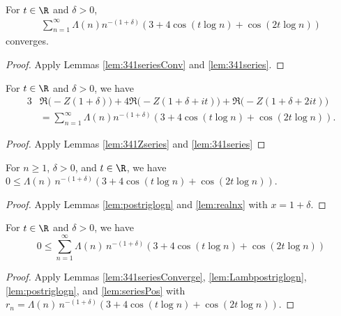 \begin{lemma}\label{lem:341seriesConverge}  \leanok
For $t\in\R$ and $\delta>0$,
\begin{align*}
\sum_{n=1}^{\infty} \Lambda(n) n^{-(1+\delta)}(3 + 4\cos(t\log n) + \cos(2t\log n))
\end{align*}
converges.
\end{lemma}
\begin{proof} \leanok {}
Apply Lemmas \ref{lem:341seriesConv} and \ref{lem:341series}.
\end{proof}

\begin{lemma}\label{lem:341series2}  \leanok
For $t\in\R$ and $\delta>0$, we have
\begin{align*}
3&\Re\big(-Z(1+\delta)\big) + 4\Re\big(-Z(1+\delta+it)\big) + \Re\big(-Z(1+\delta+2it)\big)\\
& =  \sum_{n=1}^{\infty} \Lambda(n) n^{-(1+\delta)}(3 + 4\cos(t\log n) + \cos(2t\log n)).
\end{align*}
\end{lemma}
\begin{proof} \leanok {}
Apply Lemmas \ref{lem:341Zseries} and \ref{lem:341series}
\end{proof}


\begin{lemma}\label{lem:Lambpostriglogn}  \leanok
For $n\ge1$, $\delta>0$, and $t\in\R$, we have $0\le \Lambda(n)\, n^{-(1+\delta)}(3 + 4\cos(t\log n) + \cos(2t\log n))$.
\end{lemma}
\begin{proof} \leanok {}
Apply Lemmas \ref{lem:postriglogn} and \ref{lem:realnx} with $x=1+\delta$.
\end{proof}


\begin{lemma}\label{lem:seriespos}  \leanok
For $t\in\R$ and $\delta>0$, we have
$$0\le \sum_{n=1}^{\infty} \Lambda(n)\, n^{-(1+\delta)}(3 + 4\cos(t\log n) + \cos(2t\log n))$$
\end{lemma}
\begin{proof} \leanok {}
Apply Lemmas \ref{lem:341seriesConverge}, \ref{lem:Lambpostriglogn}, \ref{lem:postriglogn}, and \ref{lem:seriesPos} with $r_n = \Lambda(n)\, n^{-(1+\delta)}(3 + 4\cos(t\log n) + \cos(2t\log n))$.
\end{proof}

